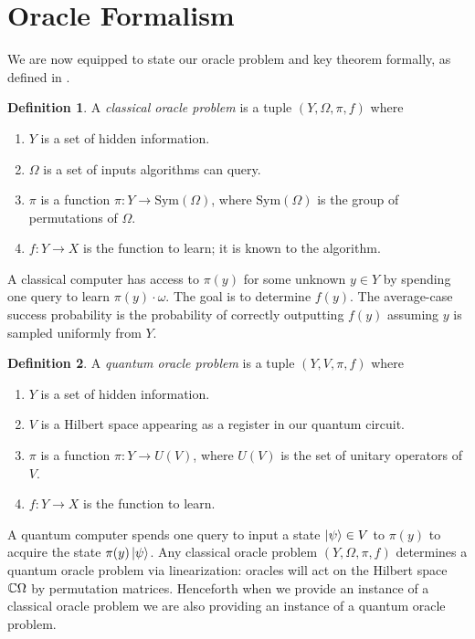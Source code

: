 \documentclass[12pt,twoside]{reedthesis}
\theoremstyle{plain}   %
\theoremstyle{definition}
\newtheorem{defn}{Definition}[section]
\theoremstyle{remark}
\numberwithin{equation}{section}
\def\Sym{\mathrm{Sym}}
\begin{document}
  \section{Oracle Formalism}
  We are now equipped to state our oracle problem and key theorem formally, as defined in \cite[Section 2]{copeland}.
  \begin{defn}
    A \emph{classical oracle problem} is a tuple $(Y, \Omega, \pi, f)$ where
    \begin{enumerate}
    \item $Y$ is a set of hidden information.
    \item $\Omega$ is a set of inputs algorithms can query.
    \item $\pi$ is a function $\pi: Y \to \Sym(\Omega )$, where $\Sym(\Omega)$ is the group of permutations of $\Omega$.
    \item $f: Y \to X$ is the function to learn; it is known to the algorithm. 
    \end{enumerate}
    A classical computer has access to $\pi(y)$ for some unknown $y \in Y$ by spending one query to learn $\pi(y) \cdot \omega$.
    The goal is to determine $f(y)$.
    The average-case success probability is the probability of correctly outputting $f(y)$ assuming $y$ is sampled uniformly from $Y$.
  \end{defn}
  \begin{defn}
    A \emph{quantum oracle problem} is a tuple $(Y, V, \pi, f)$ where
    \begin{enumerate}
    \item $Y$ is a set of hidden information.
    \item $V$ is a Hilbert space appearing as a register in our quantum circuit.
    \item $\pi$ is a function $\pi: Y \to U(V)$, where $U(V)$ is the set of unitary operators of $V$.
    \item $f: Y \to X$ is the function to learn.
    \end{enumerate}
    A quantum computer spends one query to input a state $\ket{\psi} \in V$ to $\pi(y)$ to acquire the state $\pi(y) \ket{\psi}$.
    Any classical oracle problem $(Y,\Omega, \pi, f)$ determines a quantum oracle problem via linearization:
    oracles will act on the Hilbert space $\mathbb{C} \Omega$ by permutation matrices.
    Henceforth when we provide an instance of a classical oracle problem we are also providing an instance of a quantum oracle problem.
  \end{defn}
\end{document}
